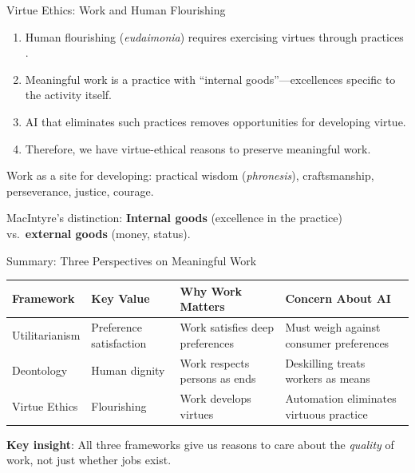 ﻿\documentclass[aspectratio=169,11pt]{beamer}
\begin{document}
\begin{frame}{Virtue Ethics: Work and Human Flourishing}
\begin{probox}
\small
\begin{enumerate}
    \item Human flourishing (\emph{eudaimonia}) requires exercising virtues through practices \parencite{aristotle_nicomachean,macintyre_after_virtue}.
    \item Meaningful work is a practice with ``internal goods''---excellences specific to the activity itself.
    \item AI that eliminates such practices removes opportunities for developing virtue.
    \item Therefore, we have virtue-ethical reasons to preserve meaningful work.
\end{enumerate}
\end{probox}

\vspace{0.2em}
Work as a site for developing: practical wisdom (\emph{phronesis}), craftsmanship, perseverance, justice, courage.

\vspace{0.2em}
MacIntyre's distinction: \textbf{Internal goods} (excellence in the practice) vs.\ \textbf{external goods} (money, status).
\end{frame}

\begin{frame}{Summary: Three Perspectives on Meaningful Work}
\begin{table}[h]
\centering
\scriptsize
\begin{tabular}{@{}p{2.3cm}p{2.8cm}p{3.2cm}p{3.5cm}@{}}
\toprule
\textbf{Framework} & \textbf{Key Value} & \textbf{Why Work Matters} & \textbf{Concern About AI} \\
\midrule
Utilitarianism & Preference satisfaction & Work satisfies deep preferences & Must weigh against consumer preferences \\
\addlinespace
Deontology & Human dignity & Work respects persons as ends & Deskilling treats workers as means \\
\addlinespace
Virtue Ethics & Flourishing & Work develops virtues & Automation eliminates virtuous practice \\
\bottomrule
\end{tabular}
\end{table}

\vspace{0.2em}
\textbf{Key insight}: All three frameworks give us reasons to care about the \emph{quality} of work, not just whether jobs exist.
\end{frame}
\end{document}
